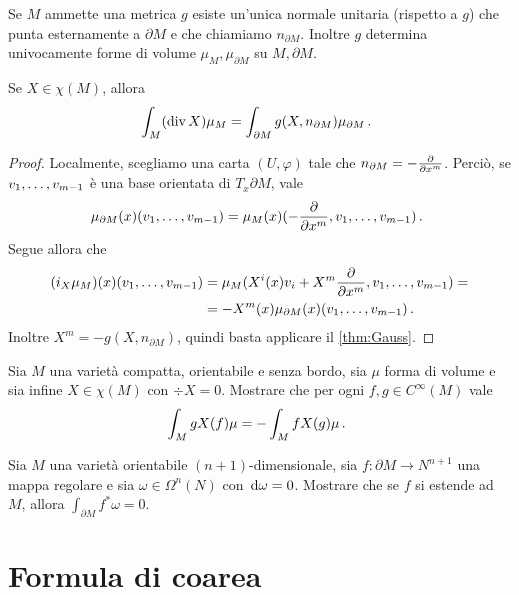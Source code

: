 Se $M$ ammette una metrica $g$ esiste un'unica normale unitaria (rispetto a $g$) che punta esternamente a $\partial M$ e che chiamiamo $n_{\partial M}$. Inoltre $g$ determina univocamente forme di volume $\mu_M,\mu_{\partial M}$ su $M,\partial M$.

\begin{corollary}
	Se $X\in\chi(M)$, allora
	\begin{equation*}
		\int_M (\div X) \mu_M = \int_{\partial M} g(X,n_{\partial M}) \mu_{\partial M} \punto
	\end{equation*}
\end{corollary}
\begin{proof}
	Localmente, scegliamo una carta $(U,\varphi)$ tale che $n_{\partial M} = - \DerParz{}{x^m}$. Perciò, se $\seqb v{m-1},$ è una base orientata di $T_x\partial M$, vale
	\begin{equation*}
	\mu_{\partial M}(x) (\seqb v{m-1},) = \mu_M(x) (-\DerParz{}{x^m},\seqb v{m-1},)\punto
	\end{equation*}
	Segue allora che
	\begin{align*}
		(i_X\mu_M)(x)(\seqb v{m-1},) &= \mu_M (X^i(x)v_i + X^m\DerParz{}{x^m},\seqb v{m-1},) =\\
		&= -X^m(x) \mu_{\partial M}(x) (\seqb v{m-1},) \punto
	\end{align*}
	Inoltre $X^m = -g(X,n_{\partial M})$, quindi basta applicare il \cref{thm:Gauss}.
\end{proof}


\begin{exercise}
	Sia $M$ una varietà compatta, orientabile e senza bordo, sia $\mu$ forma di volume e sia infine $X\in\chi(M)$ con $\div X=0$. Mostrare che per ogni $f,g \in C^\infty(M)$ vale
	\begin{equation*}
		\int_M gX(f)\mu = -\int_M fX(g) \mu \punto
	\end{equation*}
\end{exercise}
\begin{exercise}
	Sia $M$ una varietà orientabile $(n+1)$-dimensionale, sia $f:\partial M \to N^{n+1}$ una mappa regolare e sia $\omega \in \Omega^n(N)$ con $\de \omega =0$. Mostrare che se $f$ si estende ad $M$, allora $\int_{\partial M} f^*\omega =0$.
\end{exercise}


\section{Formula di coarea}

